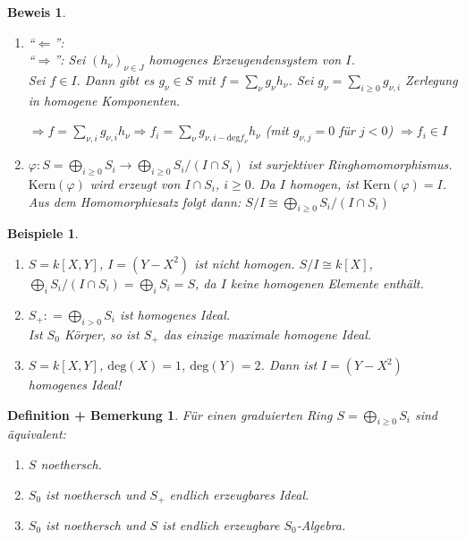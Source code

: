 \documentclass[a4paper,12pt]{scrbook}
\theoremstyle{break}
\newtheorem{DefBem}[Def]{Definition + Bemerkung}
\theoremstyle{nonumberbreak}
\newtheorem{Bew}{Beweis}
\newtheorem{nnBsp}{Beispiele}
\theoremstyle{nonumberplain}
\newcommand{\defeqr}[0]{\mathrel{\mathop:}=}
\begin{document}
\begin{Bew}
\begin{enumerate}
\item[(b)] ``$\Leftarrow$'': \checkmark\\
``$\Rightarrow$'': Sei $(h_{\nu})_{\nu\in J}$ homogenes Erzeugendensystem von $I$.\\
Sei $f\in I$. Dann gibt es $g_\nu\in S$ mit $f=\sum_{\nu}g_\nu h_\nu$.
Sei $g_\nu=\sum_{i\geq 0}g_{\nu,i}$ Zerlegung in homogene Komponenten.

$\Rightarrow f=\sum_{\nu, i} g_{\nu,i}h_\nu
\Rightarrow f_i=\sum_\nu g_{\nu,i-\textrm{deg} f_\nu}h_\nu$ 
(mit $g_{\nu,j}=0$ für $j< 0$) $\Rightarrow f_i\in I$

\item[(d)] $\varphi: S = \bigoplus_{i \geq 0}S_i\to \bigoplus_{i \geq 0} S_i/(I\cap S_i)$ ist
surjektiver Ringhomomorphismus. $\textrm{Kern}(\varphi)$ wird erzeugt von $I\cap S_i$, $i\geq 0$.
Da $I$ homogen, ist $\textrm{Kern}(\varphi)=I$. Aus dem Homomorphiesatz folgt dann:
$S/I\cong \bigoplus_{i\geq 0}S_i/(I\cap S_i)$
\end{enumerate}
\end{Bew}

\begin{nnBsp}
\begin{enumerate}

\item[(1)] $S=k[X,Y]$, $I=(Y-X^2)$ ist \emph{nicht} homogen.
$S/I\cong k[X]$, $\bigoplus_i S_i/(I\cap S_i)=\bigoplus_i S_i=S$, da $I$ keine homogenen Elemente enthält.

\item[(2)] $S_{+} \defeqr \bigoplus_{i> 0}S_i$ ist homogenes Ideal.\\
Ist $S_0$ Körper, so ist $S_{+}$ das einzige maximale homogene Ideal.

\item[(3)] $S=k[X,Y]$, $\textrm{deg}(X)=1$, $\textrm{deg}(Y)=2$. 
Dann ist $I=(Y-X^2)$ homogenes Ideal!

\end{enumerate}
\end{nnBsp}

\begin{DefBem} \label{2.15}
Für einen graduierten Ring $S=\bigoplus_{i\geq 0} S_i$ sind äquivalent:
\begin{enumerate}
\item[(i)] $S$ noethersch.
\item[(ii)] $S_0$ ist noethersch und $S_{+}$ endlich erzeugbares Ideal.
\item[(iii)] $S_0$ ist noethersch und $S$ ist endlich erzeugbare $S_0$-Algebra.
\end{enumerate}
\end{DefBem}
\end{document}

